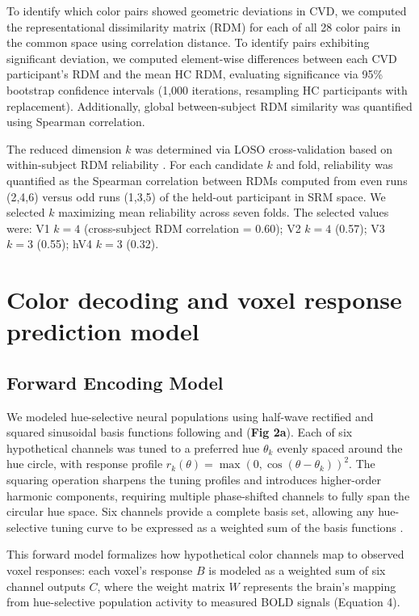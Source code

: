 To identify which color pairs showed geometric deviations in CVD, we computed the representational dissimilarity matrix (RDM) for each of all 28 color pairs in the common space using correlation distance. To identify pairs exhibiting significant deviation, we computed element-wise differences between each CVD participant's RDM and the mean HC RDM, evaluating significance via 95\% bootstrap confidence intervals (1,000 iterations, resampling HC participants with replacement). Additionally, global between-subject RDM similarity was quantified using Spearman correlation.

The reduced dimension $k$ was determined via LOSO cross-validation based on within-subject RDM reliability \cite{cunningham2014}. For each candidate $k$ and fold, reliability was quantified as the Spearman correlation between RDMs computed from even runs (2,4,6) versus odd runs (1,3,5) of the held-out participant in SRM space. We selected $k$ maximizing mean reliability across seven folds. The selected values were: V1 $k = 4$ (cross-subject RDM correlation = 0.60); V2 $k = 4$ (0.57); V3 $k = 3$ (0.55); hV4 $k = 3$ (0.32).

\section{Color decoding and voxel response prediction model}

\subsection*{Forward Encoding Model}

We modeled hue-selective neural populations using half-wave rectified and squared sinusoidal basis functions following \textcite{brouwer2009} and \textcite{brouwer2013} (\textbf{Fig 2a}). Each of six hypothetical channels was tuned to a preferred hue $\theta_k$ evenly spaced around the hue circle, with response profile $r_k(\theta) = \max(0, \cos(\theta - \theta_k))^2$. The squaring operation sharpens the tuning profiles and introduces higher-order harmonic components, requiring multiple phase-shifted channels to fully span the circular hue space. Six channels provide a complete basis set, allowing any hue-selective tuning curve to be expressed as a weighted sum of the basis functions \cite{freeman1991}.

This forward model formalizes how hypothetical color channels map to observed voxel responses: each voxel's response $B$ is modeled as a weighted sum of six channel outputs $C$, where the weight matrix $W$ represents the brain's mapping from hue-selective population activity to measured BOLD signals (Equation 4).

